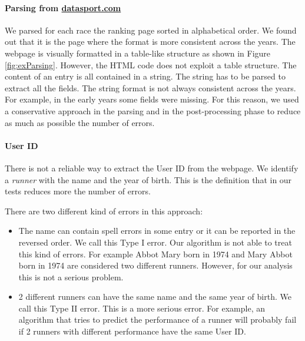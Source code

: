 \documentclass[fleqn,10pt]{wlscirep}
\begin{document}
        \paragraph{Parsing from \url{datasport.com}}
        We parsed for each race the ranking page sorted in alphabetical order. We found out that it
        is the page where the format is more consistent across the years.
        The webpage is visually formatted in a table-like structure as shown in Figure \ref{fig:exParsing}.
        However, the HTML code does not exploit a table structure. The content of an entry
        is all contained in a string. The string has to be parsed to extract all the fields.
        The string format is not always consistent across the years.
        For example, in the early years some fields were missing.
        For this reason, we used a conservative approach in the parsing and in the post-processing phase 
        to reduce as much as possible the number of errors. 

        \paragraph{User ID} There is not a reliable way to extract the User ID from the webpage.
        We identify a \textit{runner} with the name and the year of birth. 
        This is the definition
        that in our tests reduces more the number of errors. 

        There are two different kind of errors in this approach:
        \begin{itemize} 
                \item The name can contain spell errors in some entry or it can be reported in the 
                    reversed order. We call this Type I error.
                    Our algorithm is not able to treat this kind of errors.
                    For example Abbot Mary born in 1974 and Mary Abbot born in
                    1974 are considered two different runners.
                    However, for our analysis this is not a serious problem.
                \item 2 different runners can have the same name and the same year of birth.
                    We call this Type II error.
                    This is a more serious error. 
                    For example, an algorithm that tries to predict the performance of a runner
                    will probably fail if 2 runners with different performance have
                    the same User ID.
        \end{itemize}
\end{document}
